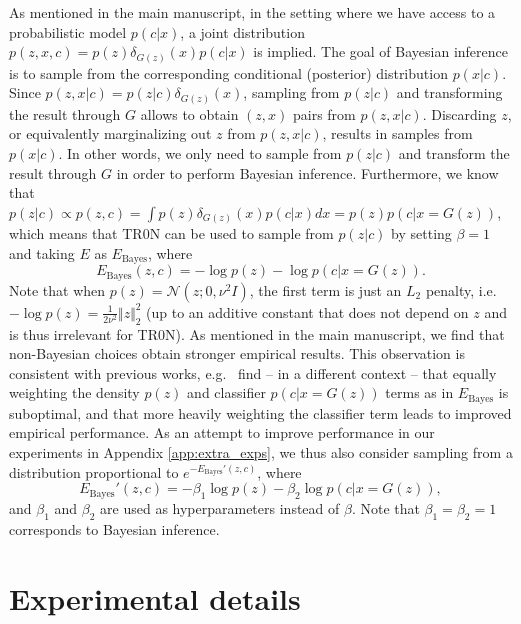 \documentclass[nohyperref]{article}
\theoremstyle{plain}
\theoremstyle{definition}
\theoremstyle{remark}
\begin{document}
As mentioned in the main manuscript, in the setting where we have access to a probabilistic model $p(c|x)$, a joint distribution $p(z,x,c)=p(z)\delta_{G(z)}(x)p(c|x)$ is implied. The goal of Bayesian inference is to sample from the corresponding conditional (posterior) distribution $p(x|c)$. Since $p(z,x|c) = p(z|c) \delta_{G(z)}(x)$, sampling from $p(z|c)$ and transforming the result through $G$ allows to obtain $(z,x)$ pairs from $p(z,x|c)$. Discarding $z$, or equivalently marginalizing out $z$ from $p(z,x|c)$, results in samples from $p(x|c)$. In other words, we only need to sample from $p(z|c)$ and transform the result through $G$ in order to perform Bayesian inference. Furthermore, we know that $p(z|c) \propto p(z,c) = \int p(z)\delta_{G(z)}(x)p(c|x) dx= p(z)p(c|x=G(z))$, which means that TR0N can be used to sample from $p(z|c)$ by setting $\beta=1$ and taking $E$ as $E_{\text{Bayes}}$, where
\begin{equation}\label{eq:bayes}
    E_{\text{Bayes}}(z,c) = -\log p(z) - \log p(c|x=G(z)).
\end{equation}
Note that when $p(z) = \mathcal{N}(z;0, \nu^2 I)$, the first term is just an $L_2$ penalty, i.e.\ $-\log p(z) = \frac{1}{2\nu^2}\Vert z \Vert_2^2$ (up to an additive constant that does not depend on $z$ and is thus irrelevant for TR0N). 
As mentioned in the main manuscript, we find that non-Bayesian choices obtain stronger empirical results. This observation is consistent with previous works, e.g.\ \citet{dhariwal2021diffusion} find -- in a different context -- that equally weighting the density $p(z)$ and classifier $p(c|x=G(z))$ terms as in $E_{\text{Bayes}}$ is suboptimal, and that more heavily weighting the classifier term leads to improved empirical performance. As an attempt to improve performance in our experiments in Appendix \ref{app:extra_exps}, we thus also consider sampling from a distribution proportional to $e^{-E_{\text{Bayes}}'(z,c)}$, where
\begin{equation}\label{eq:bayes_prime}
    E_{\text{Bayes}}'(z,c) = -\beta_1 \log p(z) - \beta_2 \log p(c|x=G(z)),
\end{equation}
and $\beta_1$ and $\beta_2$ are used as hyperparameters instead of $\beta$. Note that $\beta_1=\beta_2=1$ corresponds to Bayesian inference.




\section{Experimental details}\label{app:exp_details}
\end{document}
